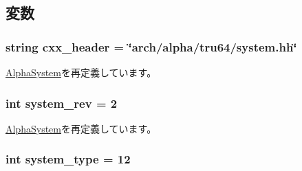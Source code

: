 \subsection{変数}
\hypertarget{classAlphaSystem_1_1Tru64AlphaSystem_a17da7064bc5c518791f0c891eff05fda}{
\subsubsection[{cxx\_\-header}]{\setlength{\rightskip}{0pt plus 5cm}string cxx\_\-header = \char`\"{}arch/alpha/tru64/system.hh\char`\"{}}}
\label{classAlphaSystem_1_1Tru64AlphaSystem_a17da7064bc5c518791f0c891eff05fda}


\hyperlink{classAlphaSystem_1_1AlphaSystem_a17da7064bc5c518791f0c891eff05fda}{AlphaSystem}を再定義しています。\hypertarget{classAlphaSystem_1_1Tru64AlphaSystem_a261e4081ddd1f0823eccc0f042086c27}{
\subsubsection[{system\_\-rev}]{\setlength{\rightskip}{0pt plus 5cm}int system\_\-rev = 2}}
\label{classAlphaSystem_1_1Tru64AlphaSystem_a261e4081ddd1f0823eccc0f042086c27}


\hyperlink{classAlphaSystem_1_1AlphaSystem_a0f86e3835b8bf2135faf7b1bab968494}{AlphaSystem}を再定義しています。\hypertarget{classAlphaSystem_1_1Tru64AlphaSystem_acfe3506cfe10e05a2cb2c2973dc5dad2}{
\subsubsection[{system\_\-type}]{\setlength{\rightskip}{0pt plus 5cm}int system\_\-type = 12}}
\label{classAlphaSystem_1_1Tru64AlphaSystem_acfe3506cfe10e05a2cb2c2973dc5dad2}


